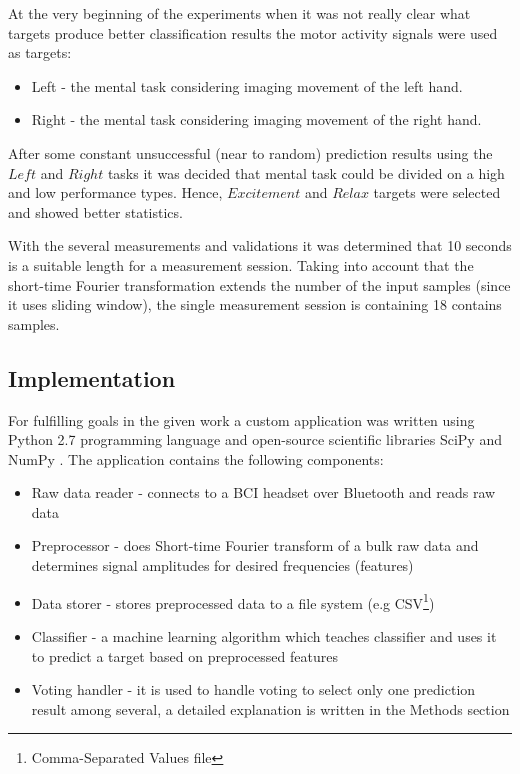 \documentclass[12pt]{article}
\theoremstyle{definition}
\begin{document}
At the very beginning of the experiments when it was not really clear what targets produce better classification results the motor activity signals were used as targets:
\begin{itemize}
\item Left - the mental task considering imaging movement of the left hand.
\item Right - the mental task considering imaging movement of the right hand.
\end{itemize}
After some constant unsuccessful (near to random) prediction results using the $Left$ and $Right$ tasks it was decided that mental task could be divided on a high and low performance types. Hence, $Excitement$ and $Relax$ targets were selected and showed better statistics.

With the several measurements and validations it was determined that 10 seconds is a suitable length for a measurement session. Taking into account that the short-time Fourier transformation extends the number of the input samples (since it uses sliding window), the single measurement session is containing 18 contains samples.

\subsection{Implementation}

For fulfilling goals in the given work a custom application was written using Python 2.7 programming language and open-source scientific libraries SciPy \cite{scipy} and NumPy \cite{numpy}. The application contains the following components:
\begin{itemize}
\item Raw data reader - connects to a BCI headset over Bluetooth and reads raw data
\item Preprocessor -  does Short-time Fourier transform of a bulk raw data and determines signal amplitudes for desired frequencies (features)
\item Data storer - stores preprocessed data to a file system (e.g CSV\footnote{Comma-Separated Values \cite{csv} file})
\item Classifier - a machine learning algorithm which teaches classifier and uses it to predict a target based on preprocessed features
\item Voting handler - it is used to handle voting to select only one prediction result among several, a detailed explanation is written in the Methods section
\end{itemize}
\end{document}
